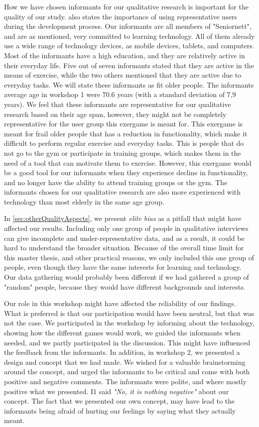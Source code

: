 How we have chosen informants for our qualitative research is important for the quality of our study. \cite{gregor} also states the importance of using representative users during the development process. Our informants are all members of "Seniornett", and are as mentioned, very committed to learning technology. All of them already use a wide range of technology devices, as mobile devices, tablets, and computers. Most of the informants have a high education, and they are relatively active in their everyday life. Five out of seven informants stated that they are active in the means of exercise, while the two others mentioned that they are active due to everyday tasks. We will state these informants as fit older people. The informants average age in workshop 1 were 70.6 years (with a standard deviation of 7,9 years). We feel that these informants are representative for our qualitative research based on their age span, however, they might not be completely representative for the user group this exergame is meant for. This exergame is meant for frail older people that has a reduction in functionality, which make it difficult to perform regular exercise and everyday tasks. This is people that do not go to the gym or participate in training groups, which makes them in the need of a tool that can motivate them to exercise. However, this exergame would be a good tool for our informants when they experience decline in functionality, and no longer have the ability to attend training groups or the gym. The informants chosen for our qualitative research are also more experienced with technology than most elderly in the same age group. 

In \ref{sec:otherQualityAspects}, we present \emph{elite bias} as a pitfall that might have affected our results. Including only one group of people in qualitative interviews can give incomplete and under-representative data, and as a result, it could be hard to understand the broader situation. Because of the overall time limit for this master thesis, and other practical reasons, we only included this one group of people, even though they have the same interests for learning and technology. Our data gathering would probably been different if we had gathered a group of "random" people, because they would have different backgrounds and interests.

Our role in this workshop might have affected the reliability of our findings. What is preferred is that our participation would have been neutral, but that was not the case. We participated in the workshop by informing about the technology, showing how the different games would work, we guided the informants when needed, and we partly participated in the discussion. This might have influenced the feedback from the informants. In addition, in workshop 2, we presented a design and concept that we had made. We wished for a valuable brainstorming around the concept, and urged the informants to be critical and come with both positive and negative comments. The informants were polite, and where mostly positive what we presented. I1 said \emph{"No, it is nothing negative"} about our concept. The fact that we presented our own concept, may have lead to the informants being afraid of hurting our feelings by saying what they actually meant. 

